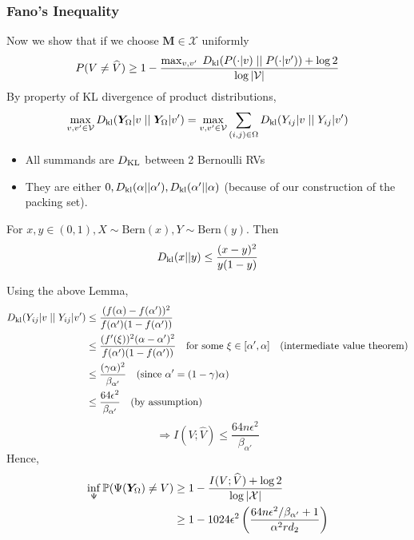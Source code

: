 \documentclass[10pt,xcolor={usenames,dvipsnames,table},aspectratio=169]{beamer}
\begin{document}
\begin{frame}
    \frametitle{Fano's Inequality}
    Now we show that if we choose $\bm{M} \in \mathcal{X}$ uniformly
    \[
     P(V \neq \widehat{V}) \geq 1-\dfrac{\max_{v, v'} \; D_{\rm kl} (P(\cdot|v) \; || \; P(\cdot| v'))
 + \log 2}{\log{\left\lvert\mathcal{V}\right\rvert}}
    \] 
    By property of KL divergence of product distributions,
    \begin{align*}
        \max_{v, v' \in \mathcal{V}} D_{\rm kl} (\bm{Y}_{\Omega} |v \; || \; \bm{Y}_{\Omega}|v') 
        = \max_{v, v' \in \mathcal{V}} \sum_{(i,j) \in \Omega} D_{\rm kl} (Y_{ij}|v \; || \; Y_{ij}|v') 
    \end{align*}
    \begin{itemize}
        \item All summands are $D_{\rm KL}$ between 2 Bernoulli RVs
        \item They are either $0, D_{\rm kl} (\alpha || \alpha'), D_{\rm kl}(\alpha' || \alpha)$ (because of our construction of the packing set).
    \end{itemize}

    \begin{lemma}
        For $x,y \in (0,1), X \sim \text{Bern}(x), Y \sim \text{Bern}(y)$. Then
        \[
        D_{\rm kl} (x || y) \leq \dfrac{(x-y)^2}{y (1-y)}
        \] 
    \end{lemma}
\end{frame}

\begin{frame}
    Using the above Lemma,
    \begin{align*}
    D_{\rm kl}(Y_{ij}|v \; || \; Y_{ij}| v') 
    &\leq \dfrac{(f(\alpha) - f(\alpha'))^2}{f(\alpha')(1- f(\alpha'))}  \\
    &\leq \dfrac{(f'(\xi))^2(\alpha - \alpha')^2}{f(\alpha')(1- f(\alpha'))} \quad \text{for some } \xi \in [\alpha', \alpha] \quad (\text{intermediate value theorem})\\
    &\leq \dfrac{(\gamma \alpha)^2}{\beta_{\alpha'}} \quad (\text{since } \alpha' = (1-\gamma)\alpha)\\
    &\leq \dfrac{64 \epsilon^2}{\beta_{\alpha'}} \quad \text{(by assumption)}
    \end{align*} 
    \[
    \Rightarrow I(V; \widehat{V}) \leq \dfrac{64 n\epsilon^2}{\beta_{\alpha'}}
    \] 
    Hence,
    \begin{align*}
    \inf_{\Psi} \mathbb{P} (\Psi (\bm{Y}_{\Omega}) \neq V) 
    &\geq  1- \dfrac{I(V; \widehat{V}) + \log 2}{\log \left\lvert\mathcal{X}\right\rvert}  \\
    &\geq 1- 1024 \epsilon^2 \left( \dfrac{64 n \epsilon^2/\beta_{\alpha'}+1}{\alpha^2 r d_2} \right)
    \end{align*}
\end{frame}
\end{document}
